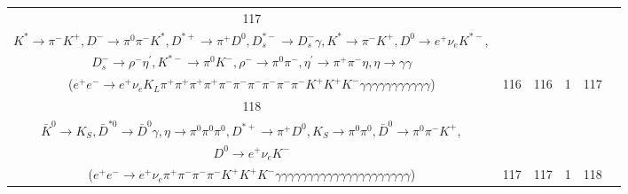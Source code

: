 \documentclass[landscape]{article}
\begin{document}
\begin{table}[htbp!]
\begin{tabular}{|c|c|c|c|c|c|}
\hline
117 & \makecell{ $ 
e^{+} e^{-} \rightarrow \Upsilon(4S) ,
\Upsilon(4S) \rightarrow B^{0} \bar{B}^{0} ,
B^{0} \rightarrow \pi^{0} \pi^{+} \eta \bar{K}^{0} K^{*} D^{-} ,
\bar{B}^{0} \rightarrow D^{*+} D_{s}^{*-} ,
\eta \rightarrow \pi^{+} \pi^{-} ,
\bar{K}^{0} \rightarrow K_{L} ,
$ \\ $
K^{*} \rightarrow \pi^{-} K^{+} ,
D^{-} \rightarrow \pi^{0} \pi^{-} K^{*} ,
D^{*+} \rightarrow \pi^{+} D^{0} ,
D_{s}^{*-} \rightarrow D_{s}^{-} \gamma ,
K^{*} \rightarrow \pi^{-} K^{+} ,
D^{0} \rightarrow e^{+} \nu_{e} K^{*-} ,
$ \\ $
D_{s}^{-} \rightarrow \rho^{-} \eta^{\prime} ,
K^{*-} \rightarrow \pi^{0} K^{-} ,
\rho^{-} \rightarrow \pi^{0} \pi^{-} ,
\eta^{\prime} \rightarrow \pi^{+} \pi^{-} \eta ,
\eta \rightarrow \gamma \gamma 
$ \\ ($
e^{+} e^{-} \rightarrow e^{+} \nu_{e} K_{L} \pi^{+} \pi^{+} \pi^{+} \pi^{+} \pi^{-} \pi^{-} \pi^{-} \pi^{-} \pi^{-} \pi^{-} K^{+} K^{+} K^{-} \gamma \gamma \gamma \gamma \gamma \gamma \gamma \gamma \gamma \gamma \gamma 
$) } & 116 & 116 & 1 & 117 \\
\hline
118 & \makecell{ $ 
e^{+} e^{-} \rightarrow \Upsilon(4S) ,
\Upsilon(4S) \rightarrow B^{0} \bar{B}^{0} ,
B^{0} \rightarrow \rho^{-} \eta \bar{K}^{0} K^{+} \bar{D}^{*0} ,
\bar{B}^{0} \rightarrow \pi^{-} \eta D^{*+} ,
\rho^{-} \rightarrow \pi^{0} \pi^{-} ,
\eta \rightarrow \pi^{0} \pi^{0} \pi^{0} ,
$ \\ $
\bar{K}^{0} \rightarrow K_{S} ,
\bar{D}^{*0} \rightarrow \bar{D}^{0} \gamma ,
\eta \rightarrow \pi^{0} \pi^{0} \pi^{0} ,
D^{*+} \rightarrow \pi^{+} D^{0} ,
K_{S} \rightarrow \pi^{0} \pi^{0} ,
\bar{D}^{0} \rightarrow \pi^{0} \pi^{-} K^{+} ,
$ \\ $
D^{0} \rightarrow e^{+} \nu_{e} K^{-} 
$ \\ ($
e^{+} e^{-} \rightarrow e^{+} \nu_{e} \pi^{+} \pi^{-} \pi^{-} \pi^{-} K^{+} K^{+} K^{-} \gamma \gamma \gamma \gamma \gamma \gamma \gamma \gamma \gamma \gamma \gamma \gamma \gamma \gamma \gamma \gamma \gamma \gamma \gamma \gamma \gamma 
$) } & 117 & 117 & 1 & 118 \\
\hline
\end{tabular}
\end{table}

\clearpage
\end{document}
